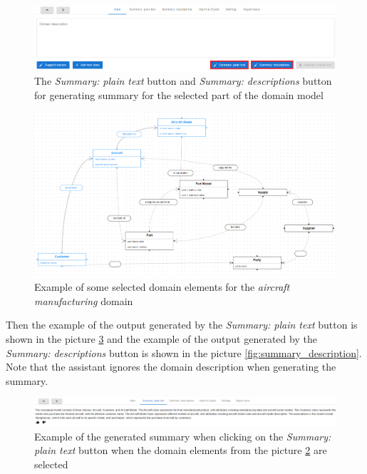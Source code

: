 \begin{figure}[!h]
    \includegraphics[scale=0.29]{../docs/images/frontend/summary-buttons.png}
    \caption{\centering The \textit{Summary: plain text} button and \textit{Summary: descriptions} button for generating summary for the selected part of the domain model}
    \label{fig:summary_buttons}
\end{figure}

\begin{figure}[!h]
    \includegraphics[scale=0.32]{../docs/images/frontend/selection-aircraft.png}
    \caption{\centering Example of some selected domain elements for the \textit{aircraft manufacturing} domain}
    \label{fig:selection_aircraft}
\end{figure}

Then the example of the output generated by the \textit{Summary: plain text} button is shown in the picture \ref{fig:summary_plain_text} and the example of the output generated by the \textit{Summary: descriptions} button is shown in the picture \ref{fig:summary_description}. Note that the assistant ignores the domain description when generating the summary.

\begin{figure}[!h]
    \includegraphics[scale=0.37]{../docs/images/frontend/summary-plain-text.png}
    \caption{\centering Example of the generated summary when clicking on the \textit{Summary: plain text} button when the domain elements from the picture \ref{fig:selection_aircraft} are selected}
    \label{fig:summary_plain_text}
\end{figure}

